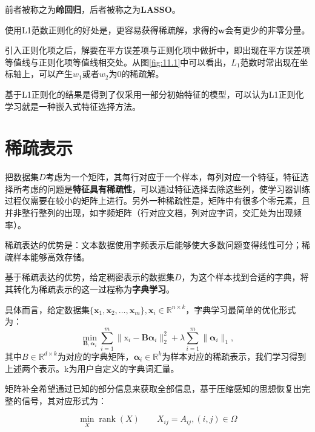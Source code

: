 前者被称之为\textbf{岭回归}，后者被称之为\textbf{LASSO}。

使用L1范数正则化的好处是，更容易获得稀疏解，求得的$\boldsymbol w$会有更少的非零分量。

\begin{figure}[!htbp]
	\centering
\end{figure}

引入正则化项之后，解要在平方误差项与正则化项中做折中，即出现在平方误差项等值线与正则化项等值线相交处。从图\ref{fig:11.1}中可以看出，$L_1$范数时常出现在坐标轴上，可以产生$w_1$或者$w_2$为0的稀疏解。

基于L1正则化的结果是得到了仅采用一部分初始特征的模型，可以认为L1正则化学习就是一种嵌入式特征选择方法。

\section{稀疏表示}\label{sec:11.5}
把数据集$D$考虑为一个矩阵，其每行对应于一个样本，每列对应一个特征，特征选择所考虑的问题是\textbf{特征具有稀疏性}，可以通过特征选择去除这些列，使学习器训练过程仅需要在较小的矩阵上进行。另外一种稀疏性是，矩阵中有很多个零元素，且并非整行整列的出现，如字频矩阵（行对应文档，列对应字词，交汇处为出现频率）。

稀疏表达的优势是：文本数据使用字频表示后能够使大多数问题变得线性可分；稀疏样本能够高效存储。

基于稀疏表达的优势，给定稠密表示的数据集$D$，为这个样本找到合适的字典，将其转化为稀疏表示的这一过程称为\textbf{字典学习}。

具体而言，给定数据集$\{\boldsymbol x_1, \boldsymbol x_2,\ldots, \boldsymbol x_m\}, \boldsymbol x_i \in \mathbb{R}^{n\times k}$，字典学习最简单的优化形式为：
\[
    \min_{\mathbf{B}, \boldsymbol \alpha_i} \sum_{i=1}^{m} \|\mathrm{x}_i - \mathbf{B}\boldsymbol \alpha_i \|^2_2 + \lambda\sum_{i=1}^{m}\|\boldsymbol \alpha_i\|_1,
\]
其中$B\in\mathbb{R}^{d\times k}$为对应的字典矩阵，$\boldsymbol \alpha_i \in \mathbb{R}^k$为样本对应的稀疏表示，我们学习得到上述两个表示。k为用户自定义的字典词汇量。

矩阵补全希望通过已知的部分信息来获取全部信息，基于压缩感知的思想恢复出完整的信号，其对应形式为：

\[
\min _{X} \operatorname{rank}(X) \quad
\quad X_{i j}=A_{i j},(i, j) \in \Omega
\]

